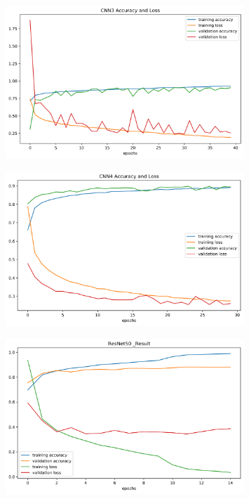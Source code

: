 \documentclass[12pt]{article}
\begin{document}
\begin{figure}[H]
\begin{center}
    \includegraphics[width=0.8\textwidth]{../plots/CNN3_Result.png}
\end{center}
\end{figure}
\begin{figure}[H]
\begin{center}
    \includegraphics[width=0.8\textwidth]{../plots/CNN4_Result.png}
\end{center}
\end{figure}
\begin{figure}[H]
\begin{center}
    \includegraphics[width=0.8\textwidth]{../plots/Resnet50_Result.png}
\end{center}
\end{figure}
\vspace*{-1.0cm}
\end{document}
